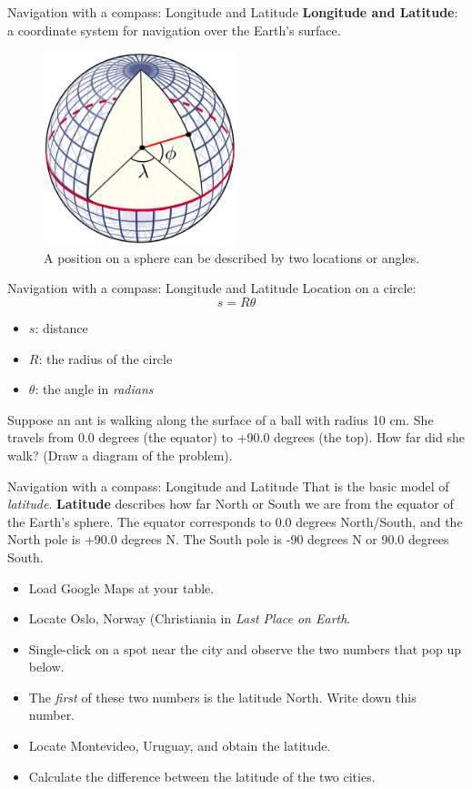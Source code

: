 \documentclass{beamer}
\begin{document}
\begin{frame}{Navigation with a compass: Longitude and Latitude}
\textbf{Longitude and Latitude}: a coordinate system for navigation over the Earth's surface.
\begin{figure}
\centering
\includegraphics[width=0.5\textwidth]{latlon.pdf}
\caption{\label{fig:latlon} A position on a sphere can be described by two locations or angles.}
\end{figure}
\end{frame}

\begin{frame}{Navigation with a compass: Longitude and Latitude}
Location on a circle: 
\begin{equation}
s = R \theta \label{eq:latlon}
\end{equation}
\begin{itemize}
\item $s$: distance
\item $R$: the radius of the circle
\item $\theta$: the angle in \textit{radians}
\end{itemize}
Suppose an ant is walking along the surface of a ball with radius 10 cm.  She travels from 0.0 degrees (the equator) to +90.0 degrees (the top).  How far did she walk? (Draw a diagram of the problem).
\end{frame}

\begin{frame}{Navigation with a compass: Longitude and Latitude}
\small
That is the basic model of \textit{latitude}.  \textbf{Latitude} describes how far North or South we are from the equator of the Earth's sphere.  The equator corresponds to 0.0 degrees North/South, and the North pole is +90.0 degrees N.  The South pole is -90 degrees N or 90.0 degrees South.
\begin{itemize}
\item Load Google Maps at your table.
\item Locate Oslo, Norway (Christiania in \textit{Last Place on Earth}.
\item Single-click on a spot near the city and observe the two numbers that pop up below.
\item The \textit{first} of these two numbers is the latitude North.  Write down this number.
\item Locate Montevideo, Uruguay, and obtain the latitude.
\item Calculate the difference between the latitude of the two cities.
\end{itemize}
\end{frame}
\end{document}
